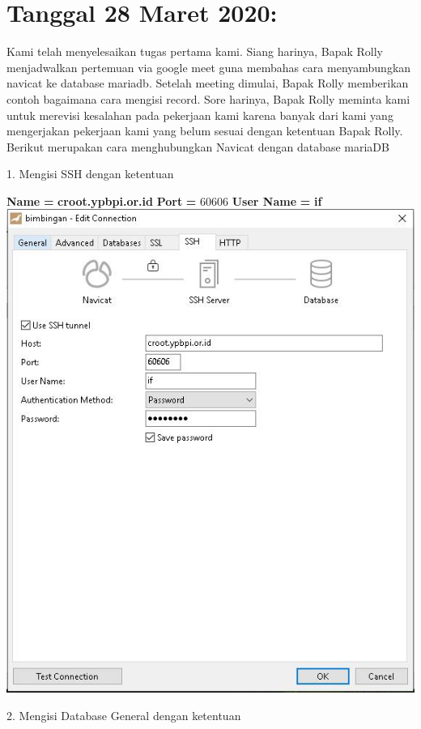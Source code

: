 \documentclass{article}
\begin{document}
\section{Tanggal 28 Maret 2020:}
Kami telah menyelesaikan tugas pertama kami. Siang harinya, Bapak Rolly menjadwalkan pertemuan via google meet guna membahas cara menyambungkan navicat ke database mariadb. Setelah meeting dimulai, Bapak Rolly memberikan contoh bagaimana cara mengisi record. Sore harinya, Bapak Rolly meminta kami untuk merevisi kesalahan pada pekerjaan kami karena banyak dari kami yang mengerjakan pekerjaan kami yang belum sesuai dengan ketentuan Bapak Rolly. Berikut merupakan cara menghubungkan Navicat dengan database mariaDB
\newline
\newline
    \item 1. Mengisi SSH dengan ketentuan
        \begin{enumerate}
            \textbf{Name}  \textbf{=} \textbf{croot.ypbpi.or.id} \newline \textbf{Port} \textbf{=} 60606 \newline \textbf{User Name} \textbf{=} \textbf{if}
            \newline
            \includegraphics[scale=0.4]{28.1.jpg}
            \newline
            \seti %
        \end{enumerate}
    \item 2. Mengisi Database General dengan ketentuan        
            
\end{document}
